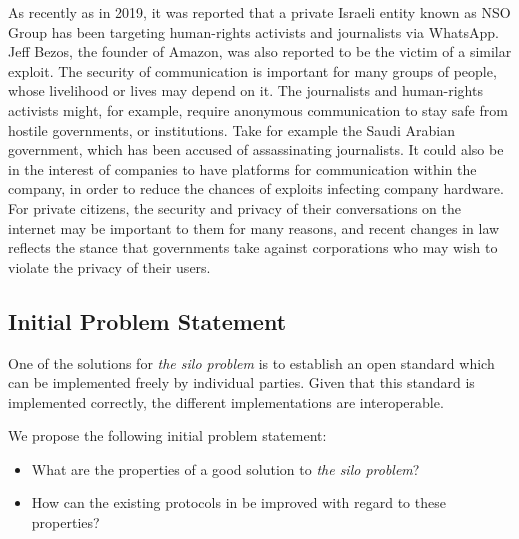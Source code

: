 As recently as in 2019, it was reported that a private Israeli entity known as NSO Group has been targeting human-rights activists and journalists via WhatsApp\cite{nytimes_nso_group}.
Jeff Bezos, the founder of Amazon, was also reported to be the victim of a similar exploit\cite{nytimes_bezos_hack}.
The security of communication is important for many groups of people, whose livelihood or lives may depend on it.
The journalists and human-rights activists might, for example, require anonymous communication to stay safe from hostile governments, or institutions.
Take for example the Saudi Arabian government, which has been accused of assassinating journalists\cite{un_jamal_report}.
It could also be in the interest of companies to have platforms for communication within the company, in order to reduce the chances of exploits infecting company hardware.
For private citizens, the security and privacy of their conversations on the internet may be important to them for many reasons, and recent changes in law reflects the stance that governments take against corporations who may wish to violate the privacy of their users.

\subsection{Initial Problem Statement}\label{subsec:initial_problem_statement}
One of the solutions for \textit{the silo problem} is to establish an open standard which can be implemented freely by individual parties.
Given that this standard is implemented correctly, the different implementations are interoperable.

We propose the following initial problem statement:
\begin{itemize}
    \item What are the properties of a good solution to \textit{the silo problem}?
    \item How can the existing protocols in \cite{twitter_comms_protocol_comparison} be improved with regard to these properties?
\end{itemize}